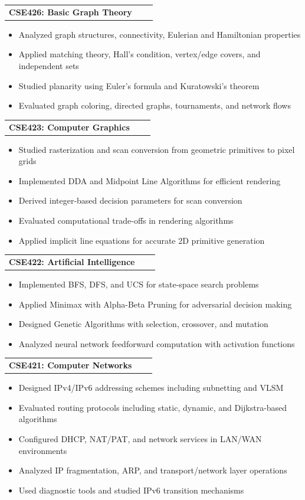 \documentclass[a4paper,12pt]{article}
\makeatletter
\newenvironment{joblong}[2]
    {
    \begin{tabularx}{\linewidth}{@{}l X r@{}}
    \textbf{#1} & \hfill &  #2 \\[3.75pt]
    \end{tabularx}
    \begin{minipage}[t]{\linewidth}
    \begin{itemize}[nosep,after=\strut, leftmargin=1em, itemsep=3pt,label=--]
    }
    {
    \end{itemize}
    \end{minipage}    
    }
\makeatother
\begin{document}
\begin{joblong}{CSE426: Basic Graph Theory}{}
\item Analyzed graph structures, connectivity, Eulerian and Hamiltonian properties
\item Applied matching theory, Hall’s condition, vertex/edge covers, and independent sets
\item Studied planarity using Euler’s formula and Kuratowski’s theorem
\item Evaluated graph coloring, directed graphs, tournaments, and network flows
\end{joblong}

\begin{joblong}{CSE423: Computer Graphics}{}
\item Studied rasterization and scan conversion from geometric primitives to pixel grids
\item Implemented DDA and Midpoint Line Algorithms for efficient rendering
\item Derived integer-based decision parameters for scan conversion
\item Evaluated computational trade-offs in rendering algorithms
\item Applied implicit line equations for accurate 2D primitive generation
\end{joblong}

\begin{joblong}{CSE422: Artificial Intelligence}{}
\item Implemented BFS, DFS, and UCS for state-space search problems
\item Applied Minimax with Alpha-Beta Pruning for adversarial decision making
\item Designed Genetic Algorithms with selection, crossover, and mutation
\item Analyzed neural network feedforward computation with activation functions
\end{joblong}

\begin{joblong}{CSE421: Computer Networks}{}
\item Designed IPv4/IPv6 addressing schemes including subnetting and VLSM
\item Evaluated routing protocols including static, dynamic, and Dijkstra-based algorithms
\item Configured DHCP, NAT/PAT, and network services in LAN/WAN environments
\item Analyzed IP fragmentation, ARP, and transport/network layer operations
\item Used diagnostic tools and studied IPv6 transition mechanisms
\end{joblong}
\end{document}
